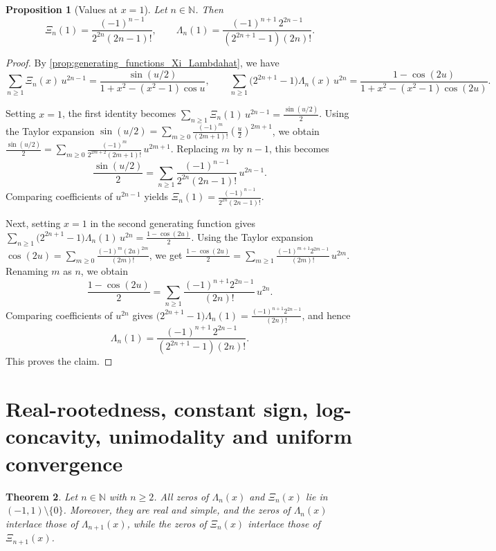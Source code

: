 \documentclass[11pt,twoside]{article}
\newtheorem{theorem}{Theorem}[section]
\newtheorem{proposition}[theorem]{Proposition}
\numberwithin{equation}{section}
\begin{document}
\begin{proposition}[Values at $x=1$]\label{prop:XiLambda-at-one}
Let $n \in \mathbb{N}$. Then
\[
\Xi_n(1)=\frac{(-1)^{n-1}}{2^{2n}(2n-1)!},
\qquad
\Lambda_n(1)=\frac{(-1)^{n+1}\,2^{2n-1}}{(2^{2n+1}-1)(2n)!}.
\]
\end{proposition}

\begin{proof}
By \cref{prop:generating_functions_Xi_Lambdahat}, we have
\[
\sum_{n\ge1}\Xi_n(x)\,u^{2n-1}
=
\frac{\sin(u/2)}{1+x^2-(x^2-1)\cos u},
\qquad
\sum_{n\ge1}\bigl(2^{2n+1}-1\bigr)\Lambda_n(x)\,u^{2n}
=
\frac{1-\cos(2u)}{1+x^2-(x^2-1)\cos(2u)}.
\]

Setting $\displaystyle x=1$, the first identity becomes $\displaystyle \sum_{n\ge1}\Xi_n(1)\,u^{2n-1}=\frac{\sin(u/2)}{2}$. Using the Taylor expansion $\displaystyle \sin(u/2)=\sum_{m\ge0}\frac{(-1)^m}{(2m+1)!}\left(\frac{u}{2}\right)^{2m+1}$, we obtain $\displaystyle \frac{\sin(u/2)}{2}=\sum_{m\ge0}\frac{(-1)^m}{2^{2m+2}(2m+1)!}\,u^{2m+1}$. Replacing $\displaystyle m$ by $\displaystyle n-1$, this becomes
\[
\frac{\sin(u/2)}{2}
=
\sum_{n\ge1}\frac{(-1)^{n-1}}{2^{2n}(2n-1)!}\,u^{2n-1}.
\]
Comparing coefficients of $\displaystyle u^{2n-1}$ yields $\displaystyle \Xi_n(1)=\frac{(-1)^{n-1}}{2^{2n}(2n-1)!}$.

Next, setting $\displaystyle x=1$ in the second generating function gives $\displaystyle \sum_{n\ge1}\bigl(2^{2n+1}-1\bigr)\Lambda_n(1)\,u^{2n}=\frac{1-\cos(2u)}{2}$. Using the Taylor expansion $\displaystyle \cos(2u)=\sum_{m\ge0}\frac{(-1)^m(2u)^{2m}}{(2m)!}$, we get $\displaystyle \frac{1-\cos(2u)}{2}=\sum_{m\ge1}\frac{(-1)^{m+1}2^{2m-1}}{(2m)!}\,u^{2m}$. Renaming $\displaystyle m$ as $\displaystyle n$, we obtain
\[
\frac{1-\cos(2u)}{2}
=
\sum_{n\ge1}\frac{(-1)^{n+1}2^{2n-1}}{(2n)!}\,u^{2n}.
\]
Comparing coefficients of $\displaystyle u^{2n}$ gives $\displaystyle \bigl(2^{2n+1}-1\bigr)\Lambda_n(1)=\frac{(-1)^{n+1}2^{2n-1}}{(2n)!}$, and hence
\[
\Lambda_n(1)=\frac{(-1)^{n+1}\,2^{2n-1}}{(2^{2n+1}-1)(2n)!}.
\]
This proves the claim.
\end{proof}

\section{Real-rootedness, constant sign, log-concavity, unimodality and uniform convergence}

\begin{theorem}\label{theorem:real-rootedness}
Let \(n\in\mathbb N\) with \(n\ge 2\). All zeros of \(\Lambda_n(x)\) and \(\Xi_n(x)\) lie in \((-1,1)\setminus\{0\}\). Moreover, they are real and simple, and the zeros of \(\Lambda_n(x)\) interlace those of \(\Lambda_{n+1}(x)\), while the zeros of \(\Xi_n(x)\) interlace those of \(\Xi_{n+1}(x)\).
\end{theorem}
\end{document}
